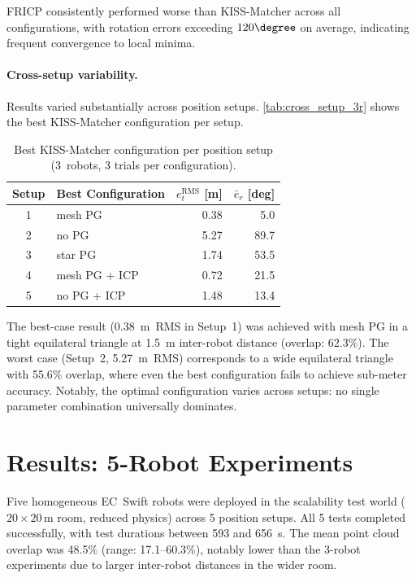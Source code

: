 FRICP consistently performed worse than KISS-Matcher across all
configurations, with rotation errors exceeding $120\degree$ on
average, indicating frequent convergence to local minima.

\paragraph{Cross-setup variability.}
Results varied substantially across position setups.
\autoref{tab:cross_setup_3r} shows the best KISS-Matcher
configuration per setup.

\begin{table}[htbp]
    \centering
    \caption{Best KISS-Matcher configuration per position setup
             (3~robots, 3 trials per configuration).}
    \label{tab:cross_setup_3r}
    \begin{tabular}{c l r r}
        \toprule
        \textbf{Setup}
            & \textbf{Best Configuration}
            & $e_t^\mathrm{RMS}$ [m]
            & $\bar{e}_r$ [deg] \\
        \midrule
        1 & mesh PG              & 0.38  &  5.0 \\
        2 & no PG                & 5.27  & 89.7 \\
        3 & star PG              & 1.74  & 53.5 \\
        4 & mesh PG + ICP        & 0.72  & 21.5 \\
        5 & no PG + ICP          & 1.48  & 13.4 \\
        \bottomrule
    \end{tabular}
\end{table}

The best-case result (\SI{0.38}{\metre}~RMS in Setup~1) was achieved
with mesh PG in a tight equilateral triangle at \SI{1.5}{\metre}
inter-robot distance (overlap: 62.3\%).
The worst case (Setup~2, \SI{5.27}{\metre}~RMS) corresponds to a
wide equilateral triangle with 55.6\% overlap, where even the best
configuration fails to achieve sub-meter accuracy.
Notably, the optimal configuration varies across setups: no single
parameter combination universally dominates.

\section{Results: 5-Robot Experiments}
\label{sec:results_5robots}

Five homogeneous EC~Swift robots were deployed in the scalability
test world ($20 \times 20$\,m room, reduced physics) across 5 position
setups.
All 5 tests completed successfully, with test durations between
593 and \SI{656}{\second}.
The mean point cloud overlap was 48.5\% (range: 17.1--60.3\%),
notably lower than the 3-robot experiments due to larger
inter-robot distances in the wider room.


